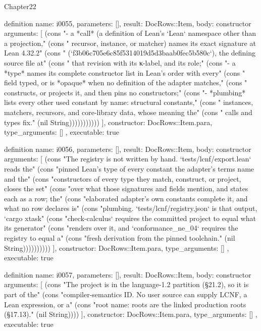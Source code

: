 \begin{lexlean}{Chapter22}
\begin{semanticmodule}
definition{
  name: i0055,
  parameters: [],
  result: DocRows::Item,
  body: constructor{
    arguments: [
      (cons "- a *call* (a definition of Lean's `Lean` namespace other than a projection," (cons "  recursor, instance, or matcher) names its exact signature at Lean 4.32.2" (cons "  (`f3b06c705e6c85f5314019d5d3baab0fec5b580c`), the defining source file at" (cons "  that revision with its κ-label, and its role;" (cons "- a *type* names its complete constructor list in Lean's order with every" (cons "  field typed, or is *opaque* when no definition of the adapter matches," (cons "  constructs, or projects it, and then pins no constructors;" (cons "- *plumbing* lists every other used constant by name: structural constants," (cons "  instances, matchers, recursors, and core-library data, whose meaning the" (cons "  calls and types fix." (nil String)))))))))))
    ],
    constructor: DocRows::Item.para,
    type_arguments: []
  },
  executable: true
}

definition{
  name: i0056,
  parameters: [],
  result: DocRows::Item,
  body: constructor{
    arguments: [
      (cons "The registry is not written by hand. `tests/lcnf/export.lean` reads the" (cons "pinned Lean's type of every constant the adapter's terms name and the" (cons "constructors of every type they match, construct, or project, closes the set" (cons "over what those signatures and fields mention, and states each as a row; the" (cons "elaborated adapter's own constants complete it, and what no row declares is" (cons "plumbing. `tests/lcnf/registry.json` is that output, `cargo xtask" (cons "check-calculus` requires the committed project to equal what its generator" (cons "renders over it, and `conformance_ne_04` requires the registry to equal a" (cons "fresh derivation from the pinned toolchain." (nil String))))))))))
    ],
    constructor: DocRows::Item.para,
    type_arguments: []
  },
  executable: true
}

definition{
  name: i0057,
  parameters: [],
  result: DocRows::Item,
  body: constructor{
    arguments: [
      (cons "The project is in the language-1.2 partition (§21.2), so it is part of the" (cons "compiler-semantics ID. No user source can supply LCNF, a Lean expression, or a" (cons "root name: roots are the linked production roots (§17.13)." (nil String))))
    ],
    constructor: DocRows::Item.para,
    type_arguments: []
  },
  executable: true
}


\end{semanticmodule}
\end{lexlean}
